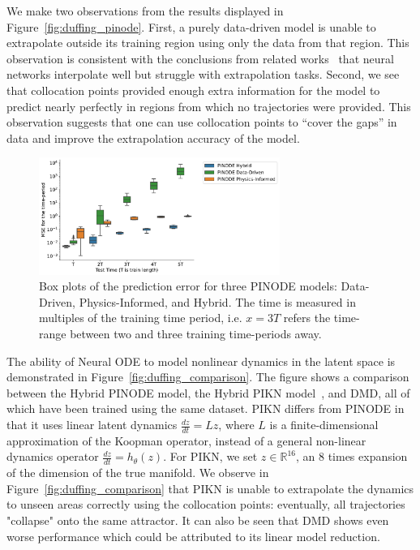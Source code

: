 We make two observations from the results displayed in Figure~\ref{fig:duffing_pinode}. First, a purely data-driven model is unable to extrapolate outside its training region using only the data from that region. This observation is consistent with the conclusions from related works~\citep{gin2021deep} that neural networks interpolate well but struggle with extrapolation tasks. Second, we see that collocation points provided enough extra information for the model to predict nearly perfectly in regions from which no trajectories were provided. This observation suggests that one can use collocation points to ``cover the gaps'' in data and improve the extrapolation accuracy of the model. 
\begin{figure}[t]
    \centering
    \includegraphics[width=0.7\textwidth]{figures/duffing_periods.pdf}
    \caption{ Box plots of the prediction error for three PINODE models: Data-Driven, Physics-Informed, and Hybrid. The time is measured in multiples of the training time period, i.e. $x=3T$ refers the time-range between two and three training time-periods away. }%
    \label{fig:duffing_periods}
\end{figure}


The ability of Neural ODE to model nonlinear dynamics in the latent space is demonstrated in Figure~\ref{fig:duffing_comparison}. The figure shows a comparison between the Hybrid PINODE model, the Hybrid PIKN model~\citep{liu2022physics}, and DMD, all of which have been trained using the same dataset. PIKN differs from PINODE in that it uses linear latent dynamics $\frac{dz}{dt} = Lz$, where $L$ is a finite-dimensional approximation of the Koopman operator, instead of a general non-linear dynamics operator $\frac{dz}{dt} = h_\theta(z)$. For PIKN, we set $z \in \mathbb{R}^{16}$, an 8 times expansion of the dimension of the true manifold. We observe in Figure~\ref{fig:duffing_comparison} that PIKN is unable to extrapolate the dynamics to unseen areas correctly using the collocation points: eventually, all trajectories "collapse" onto the same attractor. It can also be seen that DMD shows even worse performance which could be attributed to its linear model reduction.


